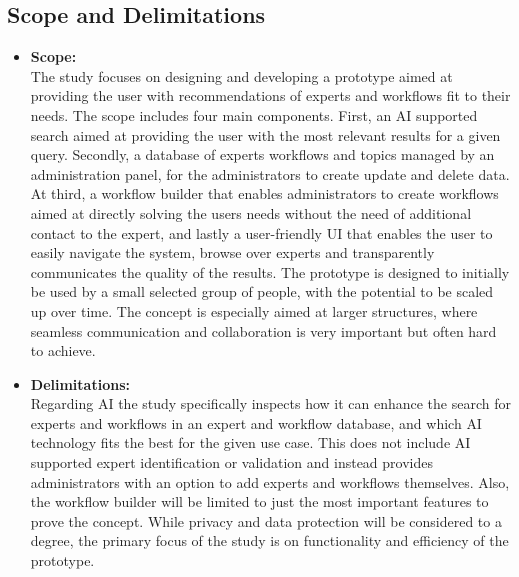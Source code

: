 \subsection{Scope and Delimitations}
\begin{itemize}
    \item \textbf{Scope:}\\
    The study focuses on designing and developing a prototype aimed at providing the user with recommendations of experts and workflows fit to their needs. The scope includes four main components. First, an \ac{AI} supported search aimed at providing the user with the most relevant results for a given query. Secondly, a database of experts workflows and topics managed by an administration panel, for the administrators to create update and delete data. At third, a workflow builder that enables administrators to create workflows aimed at directly solving the users needs without the need of additional contact to the expert, and lastly a user-friendly \ac{UI} that enables the user to easily navigate the system, browse over experts and transparently communicates the quality of the results. The prototype is designed to initially be used by a small selected group of people, with the potential to be scaled up over time. The concept is especially aimed at larger structures, where seamless communication and collaboration is very important but often hard to achieve.
    \item \textbf{Delimitations:}\\
    Regarding \ac{AI} the study specifically inspects how it can enhance the search for experts and workflows in an expert and workflow database, and which \ac{AI} technology fits the best for the given use case. This does not include \ac{AI} supported expert identification or validation and instead provides administrators with an option to add experts and workflows themselves. Also, the workflow builder will be limited to just the most important features to prove the concept. While privacy and data protection will be considered to a degree, the primary focus of the study is on functionality and efficiency of the prototype.
\end{itemize}


